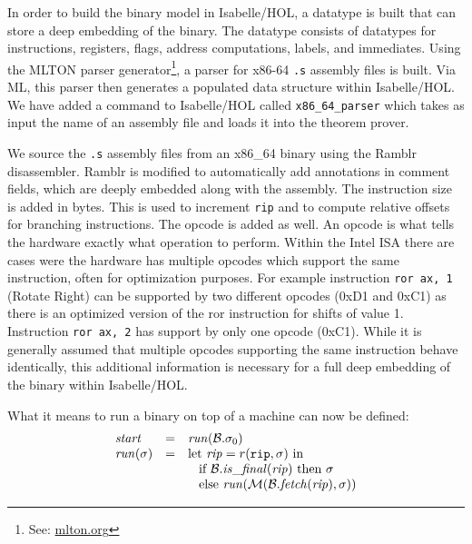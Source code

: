 In order to build the binary model in Isabelle/HOL, a datatype is built that can store a deep embedding of the binary.
The datatype consists of datatypes for instructions, registers, flags, address computations, labels, and immediates.
Using the MLTON parser generator\footnote{See: \url{mlton.org}}, a parser for x86-64 \texttt{.s} assembly files is built.
Via ML, this parser then generates a populated data structure within Isabelle/HOL.
We have added a command to Isabelle/HOL called \texttt{x86\_64\_parser} which takes as input the name of an assembly file and loads it into the theorem prover.

We source the \texttt{.s} assembly files from an x86\_64 binary using the Ramblr disassembler.
Ramblr is modified to automatically add annotations in comment fields, which are deeply embedded along with the assembly.
The instruction size is added in bytes.
This is used to increment \texttt{rip} and to compute relative offsets for branching instructions.
The opcode is added as well.
An opcode is what tells the hardware exactly what operation to perform.
Within the Intel ISA there are cases were the hardware has multiple opcodes which support the same instruction, often for optimization purposes.
For example instruction \texttt{ror ax, 1} (Rotate Right) can be supported by two different opcodes (0xD1 and 0xC1) as there is an optimized version of the ror instruction for shifts of value 1.
Instruction \texttt{ror ax, 2} has support by only one opcode (0xC1).
While it is generally assumed that multiple opcodes supporting the same instruction behave identically, this additional information is necessary for a full deep embedding of the binary within Isabelle/HOL.

What it means to run a binary on top of a machine can now be defined:
\[
\begin{array}{lcl}
\mathit{start} & = & \mathit{run}(\mathcal{B}.\sigma_0)\\
\mathit{run}(\sigma) & = & \mbox{let~} \mathit{rip} = r(\mathtt{rip}, \sigma) \mbox{~in} \\
	&& \mbox{\hspace{2ex}if~} \mathcal{B}.\mathit{is\_final}(\mathit{rip}) \mbox{~then~} \sigma\\
	&& \mbox{\hspace{2ex}else~} \mathit{run}(\mathcal{M}(\mathcal{B}.\mathit{fetch}(\mathit{rip}),\sigma))
\end{array}
\]

